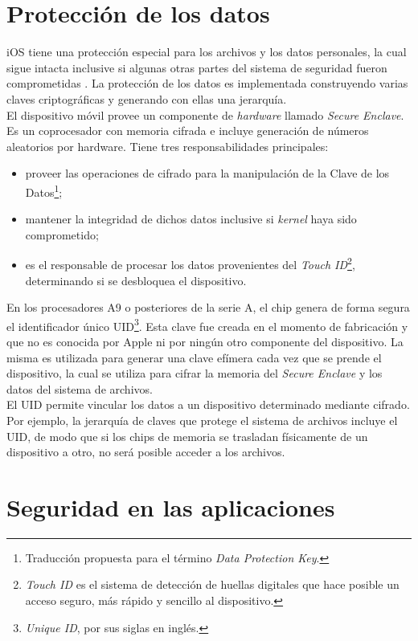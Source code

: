 \section{Protección de los datos} \label{fig:ch02:data-protection}
iOS tiene una protección especial para los archivos y los datos personales, la cual sigue intacta inclusive si algunas otras partes del sistema de seguridad fueron comprometidas \cite{asg}. La protección de los datos es implementada construyendo varias claves criptográficas y generando con ellas una jerarquía.\\
El dispositivo móvil provee un componente de \textit{hardware} llamado \textit{Secure Enclave}. Es un coprocesador con memoria cifrada e incluye generación de números aleatorios por hardware. Tiene tres responsabilidades principales:
\begin{itemize}
    \item proveer las operaciones de cifrado para la manipulación de la Clave de los Datos\footnote{Traducción propuesta para el término \textit{Data Protection Key}.};
    \item mantener la integridad de dichos datos inclusive si \textit{kernel} haya sido comprometido;
    \item es el responsable de procesar los datos provenientes del \textit{Touch ID}\footnote{\textit{Touch ID} es el sistema de detección de huellas digitales que hace posible un acceso seguro, más rápido y sencillo al dispositivo.}, determinando si se desbloquea el dispositivo.
\end{itemize}
En los procesadores A9 o posteriores de la serie A, el chip genera de forma segura el identificador único UID\footnote{\textit{Unique ID}, por sus siglas en inglés.}. Esta clave fue creada en el momento de fabricación y que no es conocida por Apple ni por ningún otro componente del dispositivo. La misma es utilizada para generar una clave efímera cada vez que se prende el dispositivo, la cual se utiliza para cifrar la memoria del \textit{Secure Enclave} y los datos del sistema de archivos.\\
El UID permite vincular los datos a un dispositivo determinado mediante cifrado. Por ejemplo, la jerarquía de claves que protege el sistema de archivos incluye el UID, de modo que si los chips de memoria se trasladan físicamente de un dispositivo a otro, no será posible acceder a los archivos.
\section{Seguridad en las aplicaciones}
